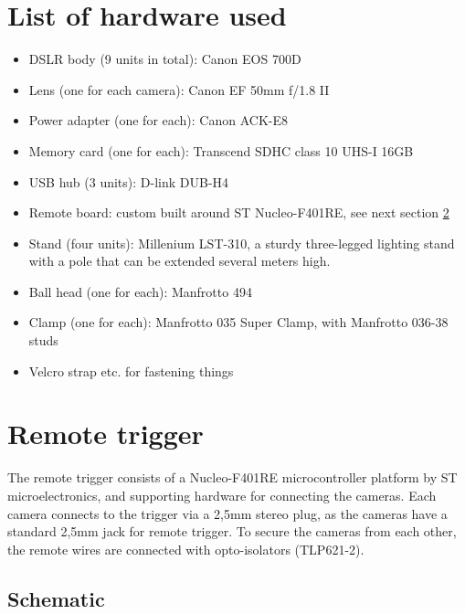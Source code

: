 \section{List of hardware used} \label{app:hardwareused}

\begin{itemize}
	\item DSLR body (9 units in total): Canon EOS 700D
	\item Lens (one for each camera): Canon EF 50mm f/1.8 II
	\item Power adapter (one for each): Canon ACK-E8
	\item Memory card (one for each): Transcend SDHC class 10 UHS-I 16GB
	\item USB hub (3 units): D-link DUB-H4
	\item Remote board: custom built around ST Nucleo-F401RE, see next section \ref{app:remotetrigger}
	\item Stand (four units): Millenium LST-310, a sturdy three-legged lighting stand with a pole that can be extended several meters high.
	\item Ball head (one for each): Manfrotto 494
	\item Clamp (one for each): Manfrotto 035 Super Clamp, with Manfrotto 036-38 studs
	\item Velcro strap etc. for fastening things
\end{itemize}

\clearpage

\section{Remote trigger} \label{app:remotetrigger}

The remote trigger consists of a Nucleo-F401RE microcontroller platform by ST microelectronics, and supporting hardware for connecting the cameras.
Each camera connects to the trigger via a 2,5mm stereo plug, as the cameras have a standard 2,5mm jack for remote trigger.
To secure the cameras from each other, the remote wires are connected with opto-isolators (TLP621-2).

\subsection{Schematic}

